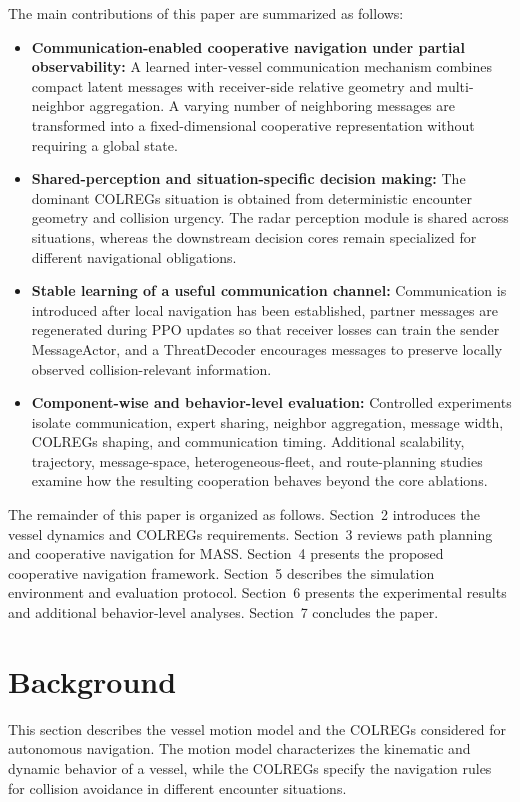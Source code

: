 \documentclass[final,5p,times,twocolumn]{elsarticle}
\begin{document}
{The main contributions of this paper are summarized as follows:
\begin{itemize}
    \item \textbf{Communication-enabled cooperative navigation under partial observability:} A learned inter-vessel communication mechanism combines compact latent messages with receiver-side relative geometry and multi-neighbor aggregation. A varying number of neighboring messages are transformed into a fixed-dimensional cooperative representation without requiring a global state.

    \item \textbf{Shared-perception and situation-specific decision making:} The dominant COLREGs situation is obtained from deterministic encounter geometry and collision urgency. The radar perception module is shared across situations, whereas the downstream decision cores remain specialized for different navigational obligations.

    \item \textbf{Stable learning of a useful communication channel:} Communication is introduced after local navigation has been established, partner messages are regenerated during PPO updates so that receiver losses can train the sender MessageActor, and a ThreatDecoder encourages messages to preserve locally observed collision-relevant information.

    \item \textbf{Component-wise and behavior-level evaluation:} Controlled experiments isolate communication, expert sharing, neighbor aggregation, message width, COLREGs shaping, and communication timing. Additional scalability, trajectory, message-space, heterogeneous-fleet, and route-planning studies examine how the resulting cooperation behaves beyond the core ablations.
\end{itemize}

The remainder of this paper is organized as follows. Section~2 introduces the vessel dynamics and COLREGs requirements. Section~3 reviews path planning and cooperative navigation for MASS. Section~4 presents the proposed cooperative navigation framework. Section~5 describes the simulation environment and evaluation protocol. Section~6 presents the experimental results and additional behavior-level analyses. Section~7 concludes the paper.
}

\section{Background}
{\color{violet}
This section describes the vessel motion model and the COLREGs considered for autonomous navigation. The motion model characterizes the kinematic and dynamic behavior of a vessel, while the COLREGs specify the navigation rules for collision avoidance in different encounter situations.
}
\end{document}
